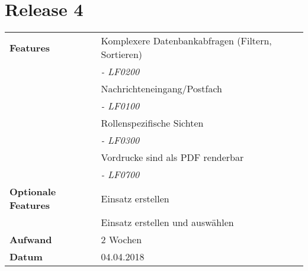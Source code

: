 \section*{Release 4}
\label{sec:release_4}

\begin{tabular}{p{5cm} p{9cm}}
    \textbf{Features} & Komplexere Datenbankabfragen (Filtern, Sortieren) \\
    & \hspace{8pt} \textit{\footnotesize - LF0200} \\
    & Nachrichteneingang/Postfach \\
    & \hspace{8pt} \textit{\footnotesize - LF0100} \\
	& Rollenspezifische Sichten \\
	& \hspace{8pt} \textit{\footnotesize - LF0300} \\
    & Vordrucke sind als PDF renderbar \\
    & \hspace{8pt} \textit{\footnotesize - LF0700} \\
    \textbf{Optionale Features} & Einsatz erstellen \\
    & Einsatz erstellen und auswählen \\
    \hline
    \textbf{Aufwand} & 2 Wochen \\
    \hline
    \textbf{Datum} & 04.04.2018
\end{tabular}
